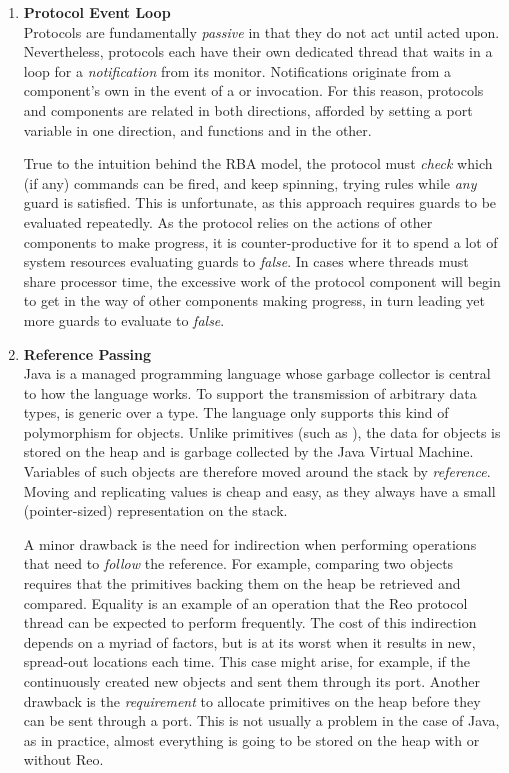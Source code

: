 \begin{enumerate}
	\item \textbf{Protocol Event Loop}\\
	Protocols are fundamentally \textit{passive} in that they do not act until acted upon. Nevertheless, protocols each have their own dedicated thread that waits in a loop for a \textit{notification} from its monitor. Notifications originate from a component's own  in the event of a  or  invocation. For this reason, protocols and components are related in both directions, afforded by setting a port variable in one direction, and functions  and  in the other.
	
	True to the intuition behind the RBA model, the protocol must \textit{check} which (if any) commands can be fired, and keep spinning, trying rules while \textit{any} guard is satisfied. This is unfortunate, as this approach requires guards to be evaluated repeatedly. As the protocol relies on the actions of other components to make progress, it is counter-productive for it to spend a lot of system resources evaluating guards to \textit{false}. In cases where threads must share processor time, the excessive work of the protocol component will begin to get in the way of other components making progress, in turn leading yet more guards to evaluate to \textit{false}.
	
	\item \textbf{Reference Passing}\\
	Java is a managed programming language whose garbage collector is central to how the language works. To support the transmission of arbitrary data types,  is generic over a type. The language only supports this kind of polymorphism for objects. Unlike primitives (such as ), the data for objects is stored on the heap and is garbage collected by the Java Virtual Machine. Variables of such objects are therefore moved around the stack by \textit{reference}. Moving and replicating values is cheap and easy, as they always have a small (pointer-sized) representation on the stack.
	
	A minor drawback is the need for indirection when performing operations that need to \textit{follow} the reference. For example, comparing two  objects requires that the  primitives backing them on the heap be retrieved and compared. Equality is an example of an operation that the Reo protocol thread can be expected to perform frequently. The cost of this indirection depends on a myriad of factors, but is at its worst when it results in new, spread-out locations each time. This case might arise, for example, if the  continuously created new  objects and sent them through its port. Another drawback is the \textit{requirement} to allocate primitives on the heap before they can be sent through a port. This is not usually a problem in the case of Java, as in practice, almost everything is going to be stored on the heap with or without Reo.
	

\end{enumerate}
